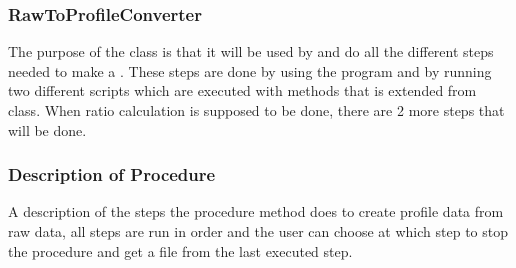 \subsubsection{RawToProfileConverter}
The purpose of the  class is that it will be used by
 and do all the different steps needed to make a . These steps are done by using the program  and by running
two different scripts which are executed with methods that is extended from
 class. When ratio calculation is supposed to be done, there are 2 more steps that will be done.

\subsubsection{Description of Procedure}
A description of the steps the procedure method does to create profile data from raw data, all steps are run in order and the user can choose at which step to stop the procedure and get a file from the last executed step.


